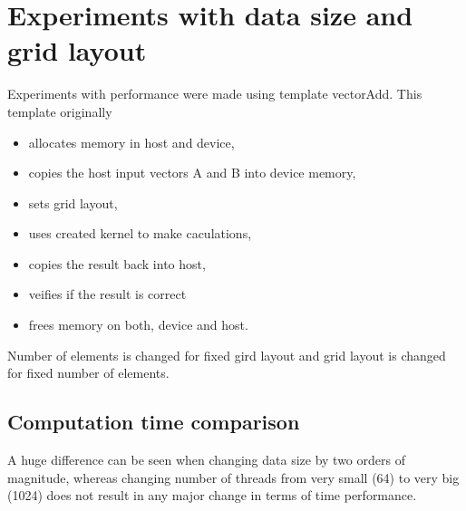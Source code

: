 \documentclass[12pt]{article}
\begin{document}
\section{Experiments with data size and grid layout}  \label{experients}
Experiments with performance were made using template vectorAdd. This template originally
\begin{itemize}
\item allocates memory in host and device,
\item copies the host input vectors A and B into device memory,
\item sets grid layout,
\item uses created kernel to make caculations,
\item copies the result back into host,
\item veifies if the result is correct
\item frees memory on both, device and host.
\end{itemize} 
Number of elements is changed for fixed gird layout and grid layout is changed for fixed number of elements.
\subsection{Computation time comparison}  \label{size_tests}


A huge difference can be seen when changing data size by two orders of magnitude, whereas changing number of threads from very small (64) to very big (1024) does not result in any major change in terms of time performance.
\end{document}
